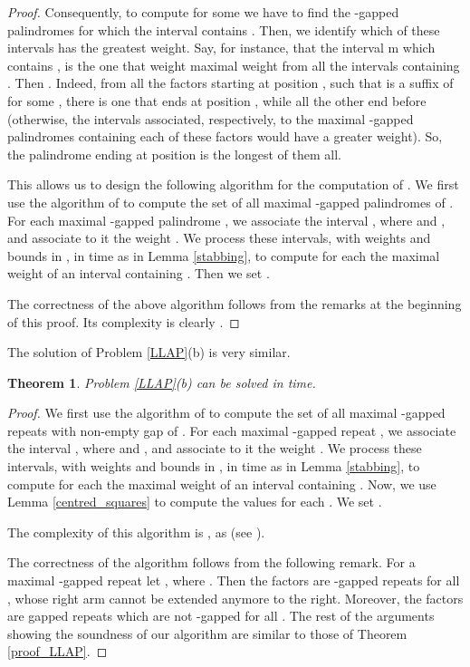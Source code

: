 \documentclass[final]{dmtcs-episciences}
\newtheorem{theorem}{Theorem}
\begin{document}
\begin{proof}
Consequently, to compute  for some  we have to find the -gapped palindromes  for which the interval  contains . Then, we identify which of these intervals has the greatest weight. Say, for instance, that the interval m which contains , is the one that weight maximal weight  from all the intervals containing . Then . Indeed, from all the factors  starting at position , such that  is a suffix of  for some , there is one that ends at position , while all the other end before  (otherwise, the intervals associated, respectively, to the maximal -gapped palindromes containing each of these factors  would have a greater weight). So, the palindrome ending at position  is the longest of them all.

This allows us to design the following algorithm for the computation of . We first use the algorithm of \cite{KK09} to compute the set  of all maximal -gapped palindromes of . For each maximal -gapped palindrome , we associate the interval , where   and , and associate to it the weight . We process these  intervals, with weights and bounds in , in  time as in Lemma \ref{stabbing}, to compute for each  the maximal weight  of an interval containing . Then we set . 

The correctness of the above algorithm follows from the remarks at the beginning of this proof. Its complexity is clearly . 
\end{proof}

The solution of Problem \ref{LLAP}(b) is very similar. 
\begin{theorem}\label{sol_LLAR}
Problem \ref{LLAP}(b) can be solved in  time.
\end{theorem}
\begin{proof}
We first use the algorithm of \cite{STACS2016} to compute the set  of all maximal -gapped repeats with non-empty gap of . For each maximal -gapped repeat , we associate the interval , where  and , and associate to it the weight . We process these  intervals, with weights and bounds in , in  time as in Lemma \ref{stabbing}, to compute for each  the maximal weight  of an interval containing . Now, we use Lemma \ref{centred_squares} to compute the values  for each . We set .

The complexity of this algorithm is , as  (see \cite{STACS2016}).

The correctness of the algorithm follows from the following remark. For a maximal -gapped repeat  let , where . Then the factors  are -gapped repeats for all , whose right arm cannot be extended anymore to the right. Moreover,  the factors  are gapped repeats which are not -gapped for all . The rest of the arguments showing the soundness of our algorithm are similar to those of Theorem \ref{proof_LLAP}.
\end{proof}
\end{document}
